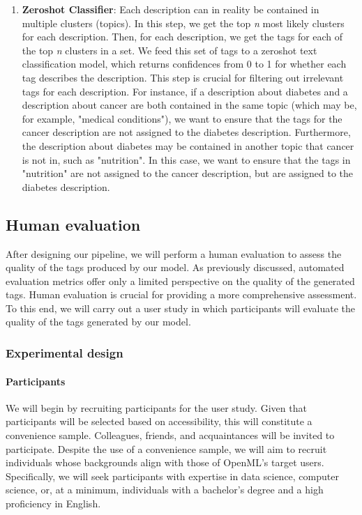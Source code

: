 \begin{enumerate}
    \item \textbf{Zeroshot Classifier}: Each description can in reality be contained in multiple clusters (topics). In this step, we get the top \textit{n} most likely clusters for each description. Then, for each description, we get the tags for each of the top \textit{n} clusters in a set. We feed this set of tags to a zeroshot text classification model, which returns confidences from 0 to 1 for whether each tag describes the description. This step is crucial for filtering out irrelevant tags for each description. For instance, if a description about diabetes and a description about cancer are both contained in the same topic (which may be, for example, "medical conditions"), we want to ensure that the tags for the cancer description are not assigned to the diabetes description. Furthermore, the description about diabetes may be contained in another topic that cancer is not in, such as "nutrition". In this case, we want to ensure that the tags in "nutrition" are not assigned to the cancer description, but are assigned to the diabetes description.

\end{enumerate}


\subsection{Human evaluation}
After designing our pipeline, we will perform a human evaluation to assess the quality of the tags produced by our model. As previously discussed, automated evaluation metrics offer only a limited perspective on the quality of the generated tags. Human evaluation is crucial for providing a more comprehensive assessment. To this end, we will carry out a user study in which participants will evaluate the quality of the tags generated by our model.

\subsubsection{Experimental design}
\paragraph{Participants}
We will begin by recruiting participants for the user study. Given that participants will be selected based on accessibility, this will constitute a convenience sample. Colleagues, friends, and acquaintances will be invited to participate. Despite the use of a convenience sample, we will aim to recruit individuals whose backgrounds align with those of OpenML's target users. Specifically, we will seek participants with expertise in data science, computer science, or, at a minimum, individuals with a bachelor's degree and a high proficiency in English.

